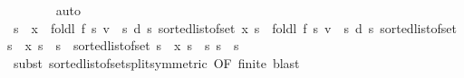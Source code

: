 \begin{isabellebody}
\ \ \ \ \ \ \isamarkupfalse%
\ auto\isanewline
\ \ \ \ \isamarkupfalse%
\ {\isachardoublequoteopen}s\ {\isacharless}{\kern0pt}\ x\ {\isasymLongrightarrow}\ foldl\ {\isacharquery}{\kern0pt}f\ {\isacharparenleft}{\kern0pt}{\isasymlambda}s{\isachardot}{\kern0pt}\ {\isacharparenleft}{\kern0pt}v\ {\isachardollar}{\kern0pt}\ s{\isacharcomma}{\kern0pt}\ d\ s{\isacharparenright}{\kern0pt}{\isacharparenright}{\kern0pt}\ {\isacharparenleft}{\kern0pt}sorted{\isacharunderscore}{\kern0pt}list{\isacharunderscore}{\kern0pt}of{\isacharunderscore}{\kern0pt}set\ {\isacharbraceleft}{\kern0pt}{\isachardot}{\kern0pt}{\isachardot}{\kern0pt}x{\isacharprime}{\kern0pt}{\isacharbraceright}{\kern0pt}{\isacharparenright}{\kern0pt}\ s\ {\isacharequal}{\kern0pt}\ foldl\ {\isacharquery}{\kern0pt}f\ {\isacharparenleft}{\kern0pt}{\isasymlambda}s{\isachardot}{\kern0pt}\ {\isacharparenleft}{\kern0pt}v\ {\isachardollar}{\kern0pt}\ s{\isacharcomma}{\kern0pt}\ d\ s{\isacharparenright}{\kern0pt}{\isacharparenright}{\kern0pt}\ {\isacharparenleft}{\kern0pt}sorted{\isacharunderscore}{\kern0pt}list{\isacharunderscore}{\kern0pt}of{\isacharunderscore}{\kern0pt}set\ {\isacharbraceleft}{\kern0pt}s{\isacharprime}{\kern0pt}\ {\isasymin}\ {\isacharbraceleft}{\kern0pt}{\isachardot}{\kern0pt}{\isachardot}{\kern0pt}x{\isacharprime}{\kern0pt}{\isacharbraceright}{\kern0pt}{\isachardot}{\kern0pt}\ s{\isacharprime}{\kern0pt}\ {\isasymle}\ s{\isacharbraceright}{\kern0pt}\ {\isacharat}{\kern0pt}\ sorted{\isacharunderscore}{\kern0pt}list{\isacharunderscore}{\kern0pt}of{\isacharunderscore}{\kern0pt}set\ {\isacharbraceleft}{\kern0pt}s{\isacharprime}{\kern0pt}\ {\isasymin}\ {\isacharbraceleft}{\kern0pt}{\isachardot}{\kern0pt}{\isachardot}{\kern0pt}x{\isacharprime}{\kern0pt}{\isacharbraceright}{\kern0pt}{\isachardot}{\kern0pt}\ s\ {\isacharless}{\kern0pt}\ s{\isacharprime}{\kern0pt}{\isacharbraceright}{\kern0pt}{\isacharparenright}{\kern0pt}\ s{\isachardoublequoteclose}\ \ s\isanewline
\ \ \ \ \ \ \isamarkupfalse%
\ {\isacharparenleft}{\kern0pt}subst\ sorted{\isacharunderscore}{\kern0pt}list{\isacharunderscore}{\kern0pt}of{\isacharunderscore}{\kern0pt}set{\isacharunderscore}{\kern0pt}split{\isacharprime}{\kern0pt}{\isacharbrackleft}{\kern0pt}symmetric{\isacharcomma}{\kern0pt}\ OF\ finite{\isacharbrackright}{\kern0pt}{\isacharparenright}{\kern0pt}\ blast\isanewline
\ \ \ \ \isamarkupfalse%

\end{isabellebody}
